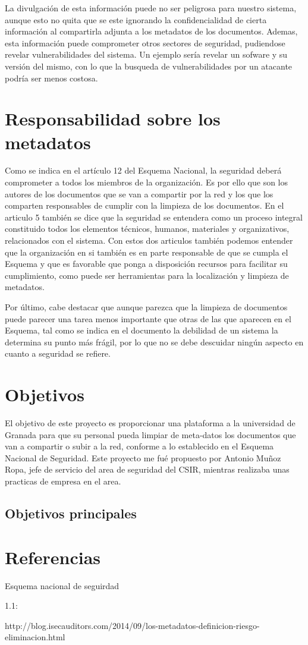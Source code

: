 La divulgación de esta información puede no ser peligrosa para nuestro sistema, aunque esto no quita que se este
ignorando la confidencialidad de cierta información al compartirla adjunta a los metadatos de los documentos. Ademas, 
esta información puede comprometer otros sectores de seguridad, pudiendose revelar vulnerabilidades del sistema. Un 
ejemplo sería revelar un sofware y su versión del mismo, con lo que la busqueda de vulnerabilidades por un atacante 
podría ser menos costosa.


\section{Responsabilidad sobre los metadatos}

Como se indica en el artículo 12 del Esquema Nacional, la seguridad deberá comprometer a todos los miembros de la 
organización. Es por ello que son los autores de los documentos que se van a compartir por la red y los que los 
comparten responsables de cumplir con la limpieza de los documentos. En el articulo 5 también se dice que la seguridad 
se entendera como un proceso integral constituido todos los elementos técnicos, humanos, materiales y organizativos, 
relacionados con el sistema. Con estos dos articulos también podemos entender que la organización en si también es en 
parte responsable de que se cumpla el Esquema y que es favorable que ponga a disposición recursos para facilitar su 
cumplimiento, como puede ser herramientas para la localización y limpieza de
metadatos.

Por último, cabe destacar que aunque parezca que la limpieza de documentos puede parecer una tarea menos importante que 
otras de las que aparecen en el Esquema, tal como se indica en el documento la debilidad de un sistema la determina su 
punto más frágil, por lo que no se debe descuidar ningún aspecto en cuanto a seguridad se refiere.


\section{Objetivos}

El objetivo de este proyecto es proporcionar una plataforma a la universidad de Granada para que su
personal pueda limpiar de meta-datos los documentos que van a compartir o subir a la red, conforme a lo establecido
en el Esquema Nacional de Seguridad. Este proyecto me fué propuesto por Antonio Muñoz Ropa, jefe de servicio del area
de seguridad del CSIR, mientras realizaba unas practicas de empresa en el area.

\subsection{Objetivos principales}



\section{Referencias}

Esquema nacional de seguirdad

1.1:

http://blog.isecauditors.com/2014/09/los-metadatos-definicion-riesgo-eliminacion.html